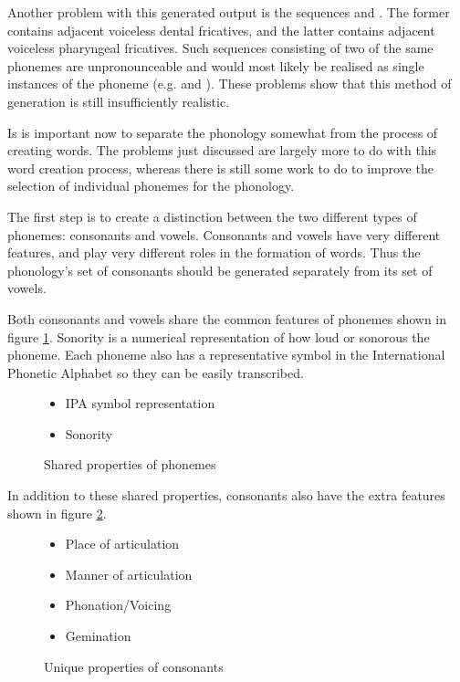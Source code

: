 \documentclass{report}
\begin{document}
	Another problem with this generated output is the sequences  and \textipa{/\textcrh\textcrh/}. The former contains adjacent voiceless dental fricatives, and the latter contains adjacent voiceless pharyngeal fricatives. Such sequences consisting of two of the same phonemes are unpronounceable and would most likely be realised as single instances of the phoneme (e.g.  and \textipa{/\textcrh/}). These problems show that this method of generation is still insufficiently realistic.
	
	Is is important now to separate the phonology somewhat from the process of creating words. The problems just discussed are largely more to do with this word creation process, whereas there is still some work to do to improve the selection of individual phonemes for the phonology.
	
	The first step is to create a distinction between the two different types of phonemes: consonants and vowels. Consonants and vowels have very different features, and play very different roles in the formation of words. Thus the phonology's set of consonants should be generated separately from its set of vowels.
	
	Both consonants and vowels share the common features of phonemes shown in figure \ref{shared properties of phonemes}. Sonority is a numerical representation of how loud or sonorous the phoneme. Each phoneme also has a representative symbol in the International Phonetic Alphabet so they can be easily transcribed.
	
	\begin{figure}
		\caption{Shared properties of phonemes}
		\label{shared properties of phonemes}
		\begin{tcolorbox}
			\begin{itemize}
				\item IPA symbol representation
				\item Sonority
			\end{itemize}
		\end{tcolorbox}
	\end{figure}

	In addition to these shared properties, consonants also have the extra features shown in figure \ref{properties of consonants}.
	
	\begin{figure}[h]
		\caption{Unique properties of consonants}
		\label{properties of consonants}
		\begin{tcolorbox}
			\begin{itemize}
				\item Place of articulation
				\item Manner of articulation
				\item Phonation/Voicing
				\item Gemination
			\end{itemize}
		\end{tcolorbox}
	\end{figure}
	
\end{document}

